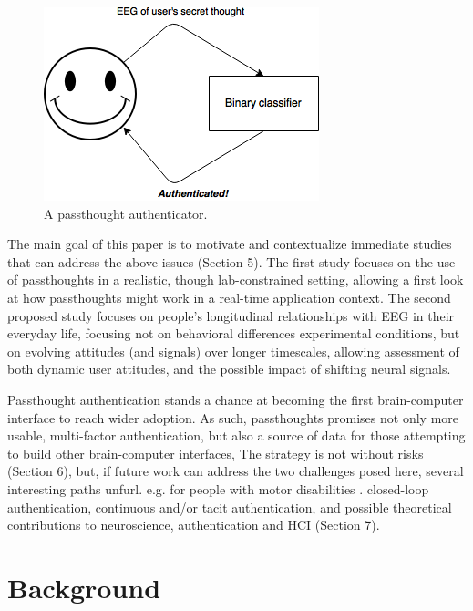 \documentclass[sigconf]{acmart}
\begin{document}
\label{fig:diagram}
\begin{figure}[htbp]
\centering
\includegraphics[width=.9\linewidth]{./figures/passthoughts-diagram.png}
\caption{A passthought authenticator.}
\end{figure}

The main goal of this paper is to motivate and contextualize immediate studies that can address the above issues (Section 5).
The first study focuses on the use of passthoughts in a realistic, though lab-constrained setting, 
allowing a first look at how passthoughts might work in a real-time application context.
The second proposed study focuses on people's longitudinal relationships with EEG in their everyday life,
focusing not on behavioral differences experimental conditions, but on evolving attitudes (and signals) over longer timescales,
allowing assessment of both dynamic user attitudes, and the possible impact of shifting neural signals.

Passthought authentication stands a chance at becoming the first brain-computer interface to reach wider adoption. 
As such, passthoughts promises not only more usable, multi-factor authentication,
but also a source of data for those attempting to build other brain-computer interfaces,
The strategy is not without risks (Section 6),
but, if future work can address the two challenges posed here, several interesting paths unfurl.
e.g. for people with motor disabilities \cite{Mattia2013}.
closed-loop authentication, continuous and/or tacit authentication, 
and possible theoretical contributions to neuroscience, authentication and HCI (Section 7).

\section{Background}
\label{sec:org4dc5ef5}
\end{document}
